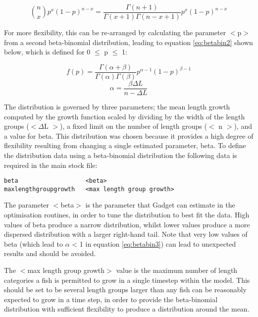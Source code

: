 \documentclass[]{book}
\begin{document}
\begin{equation}
\label{eq:betabin1}
{n \choose x} p^x (1 - p)^{n - x} = \frac{\Gamma(n + 1)}{\Gamma(x + 1)\Gamma(n - x + 1)} p^x (1 - p)^{n - x}\end{equation}

For more flexibility, this can be re-arranged by calculating the
parameter \(<\)p\(>\) from a second beta-binomial distribution, leading to
equation \eqref{eq:betabin2} shown below, which is defined for 0 \(\le\) p
\(\le\) 1:

\begin{equation}
\label{eq:betabin2}
f(p) = \frac{\Gamma(\alpha + \beta)}{\Gamma(\alpha) \Gamma(\beta)}p^{\alpha - 1}(1 - p)^{\beta - 1}\end{equation}
\begin{equation}
\label{eq:betabin3}
\alpha = \frac{\beta \Delta L}{n - \Delta L}\end{equation}

The distribution is governed by three parameters; the mean length growth
computed by the growth function scaled by dividing by the width of the
length groups (\(<\Delta\)L \(>\)), a fixed limit on the number of length
groups (\(<\) n \(>\)), and a value for beta. This distribution was chosen
because it provides a high degree of flexibility resulting from changing
a single estimated parameter, beta. To define the distribution data
using a beta-binomial distribution the following data is required in the
main stock file:

\begin{verbatim}
beta                   <beta>
maxlengthgroupgrowth   <max length group growth>
\end{verbatim}

The parameter \(<\)beta\(>\) is the parameter that Gadget can estimate in
the optimisation routines, in order to tune the distribution to best fit
the data. High values of beta produce a narrow distribution, whilst
lower values produce a more dispersed distribution with a larger
right-hand tail. Note that very low values of beta (which lead to
\(\alpha\) \textless{} 1 in
equation \eqref{eq:betabin3}) can lead to unexpected results and should be
avoided.

The \(<\)max length group growth\(>\) value is the maximum number of length
categories a fish is permitted to grow in a single timestep within the
model. This should be set to be several length groups larger than any
fish can be reasonably expected to grow in a time step, in order to
provide the beta-binomial distribution with sufficient flexibility to
produce a distribution around the mean.
\end{document}
